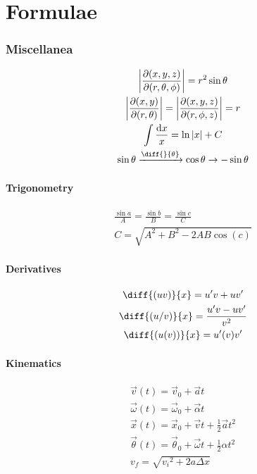 \documentclass{cheatsheet}
\begin{document}
\part*{Formulae}
	\section{Miscellanea}	
		\begin{gather*}
			\left|\frac{\partial(x,y,z)}{\partial(r,\theta,\phi)}\right| = r^2 \sin \theta \\
			\left| \frac{\partial(x,y)}{\partial(r,\theta)} \right| = \left| \frac{\partial(x,y,z)}{\partial(r,\phi,z)} \right| = r\\
			\int \frac{\mathrm{d}x}{x} = \ln|x| + C\\
			\sin\theta \xrightarrow{\diff{}{\theta}} \cos\theta \rightarrow -\sin\theta\\
		\end{gather*}
	\subsection{Trigonometry}
		\begin{gather*}
			\frac{\sin a}{A} = \frac{\sin b}{B} = \frac{\sin c}{C}	\tag{law of sines}\\
			C = \sqrt{A^2 + B^2 - 2AB\cos(c)}	\tag{law of cosines}
		\end{gather*}
	\subsection{Derivatives}
		\begin{gather*}
			\diff{(uv)}{x} = u'v + uv'	\\
			\diff{(u/v)}{x} = \frac{u'v - uv'}{v^2}	\\
			\diff{( u(v) )}{x} = u'(v)v'
		\end{gather*}
	\subsection{Kinematics}
		\begin{gather*}
			\vec v(t) = \vec v_0 + \vec at 	\tag{velocity}\\
			\vec \omega(t) = \vec\omega_0 + \vec\alpha t	\tag{rot. form}\\
			\vec x(t) = \vec x_0 + \vec vt + \frac{1}{2}\vec a t^2	\tag{displacement}\\
			\vec\theta(t) = \vec\theta_0 + \vec\omega t + \frac{1}{2}\alpha t^2	\tag{rot. form}\\
			v_f = \sqrt{{v_i}^2 + 2a\Delta x}	\tag{$v_f$}
		\end{gather*}
\end{document}
